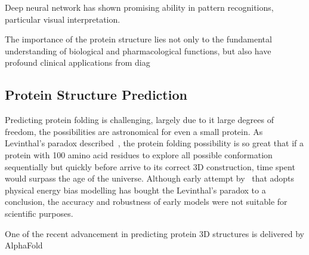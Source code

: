 Deep neural network has shown promising ability in pattern recognitions, particular visual interpretation.
\par 
The importance of the protein structure lies not only to the fundamental understanding of biological and pharmacological functions, but also have profound clinical applications from diag

\subsection{Protein Structure Prediction}
Predicting protein folding is challenging, largely due to it large degrees of freedom, the possibilities are astronomical for even a small protein. As Levinthal's paradox described~\cite{LEV69}, the protein folding possibility is so great that if a protein with 100 amino acid residues to explore all possible conformation sequentially but quickly before arrive to its correct 3D construction, time spent would surpass the age of the universe. Although early attempt by~\citet{Zwanzig_1992} that adopts physical energy bias modelling has bought the Levinthal's paradox to a conclusion, the accuracy and robustness of early models were not suitable for scientific purposes.  
\par 
One of the recent advancement in predicting protein 3D structures is delivered by AlphaFold